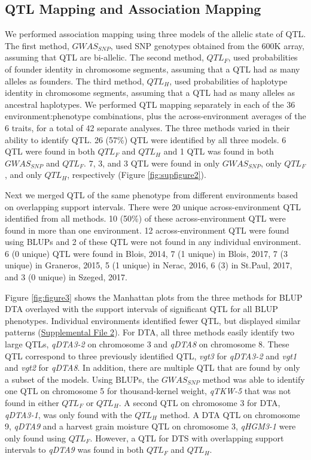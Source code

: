 \documentclass[article,9pt,twocolumn,twoside]{rilabRxiv}
\begin{document}
\subsection{QTL Mapping and Association Mapping}
We performed association mapping using three models of the allelic state of QTL.
The first method, $GWAS_{SNP}$, used SNP genotypes obtained from the 600K array, assuming that QTL are bi-allelic.
The second method, $QTL_F$, used probabilities of founder identity in chromosome segments, assuming that a QTL had as many alleles as founders.
The third method, $QTL_H$, used probabilities of haplotype identity in chromosome segments, assuming that a QTL had as many alleles as ancestral haplotypes.
We performed QTL mapping separately in each of the 36 environment:phenotype combinations, plus the across-environment averages of the 6 traits, for a total of 42 separate analyses.
The three methods varied in their ability to identify QTL.
26 (57\%) QTL were identified by all three models.
6 QTL were found in both $QTL_F$ and $QTL_H$ and 1 QTL was found in both $GWAS_{SNP}$ and $QTL_F$.
7, 3, and 3 QTL were found in only $GWAS_{SNP}$, only $QTL_F$, and only $QTL_H$, respectively (Figure \ref{fig:supfigure2}).

Next we merged QTL of the same phenotype from different environments based on overlapping support intervals.
There were 20 unique across-environment QTL identified from all methods.
10 (50\%) of these across-environment QTL were found in more than one environment.
12 across-environment QTL were found using BLUPs and 2 of these QTL were not found in any individual environment.
6 (0 unique) QTL were found in Blois, 2014, 7 (1 unique) in Blois, 2017, 7 (3 unique) in Graneros, 2015, 5 (1 unique) in Nerac, 2016, 6 (3) in St.Paul, 2017, and 3 (0 unique) in Szeged, 2017.

Figure \ref{fig:figure3} shows the Manhattan plots from the three methods for BLUP DTA overlayed with the support intervals of significant QTL for all BLUP phenotypes.
Individual environments identified fewer QTL, but displayed similar patterns (\href{run:./figures/Methods_Supplemental2.pdf}{Supplemental File 2}).
For DTA, all three methods easily identify two large QTLs, \emph{qDTA3-2} on chromosome 3 and \emph{qDTA8} on chromosome 8. These QTL correspond to three previously identified QTL, \emph{vgt3} for \emph{qDTA3-2} and \emph{vgt1} and \emph{vgt2} for \emph{qDTA8}.
In addition, there are multiple QTL that are found by only a subset of the models.
Using BLUPs, the $GWAS_{SNP}$ method was able to identify one QTL on chromosome 5 for thousand-kernel weight, \emph{qTKW-5} that was not found in either $QTL_F$ or $QTL_H$.
A second QTL on chromosome 3 for DTA, \emph{qDTA3-1}, was only found with the $QTL_H$ method.
A DTA QTL on chromosome 9, \emph{qDTA9} and a harvest grain moisture QTL on chromosome 3, \emph{qHGM3-1} were only found using $QTL_F$.
However, a QTL for DTS with overlapping support intervals to \emph{qDTA9} was found in both $QTL_F$ and $QTL_H$.
\end{document}
